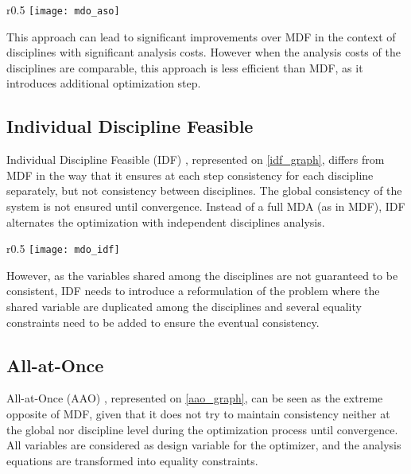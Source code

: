 \begin{wrapfigure}{r}{0.5\textwidth}
\centering
\texttt{[image: mdo\_aso]}
\caption{ASO method}\label{aso_graph}
\end{wrapfigure}

This approach can lead to significant improvements over MDF in the context of disciplines with significant analysis costs. However when the analysis costs of the disciplines are comparable, this approach is less efficient than MDF, as it introduces additional optimization step.

\subsection{Individual Discipline Feasible}

Individual Discipline Feasible (IDF) \cite{cramer1994problem}, represented on \figurename{} \ref{idf_graph}, differs from MDF in the way that it ensures at each step consistency for each discipline separately, but not consistency between disciplines. The global consistency of the system is not ensured until convergence.
Instead of a full MDA (as in MDF), IDF alternates the optimization with independent disciplines analysis.

\begin{wrapfigure}{r}{0.5\textwidth}
\centering
\texttt{[image: mdo\_idf]}
\caption{IDF method}\label{idf_graph}
\end{wrapfigure}

However, as the variables shared among the disciplines are not guaranteed to be consistent, IDF needs to introduce a reformulation of the problem where the shared variable are duplicated among the disciplines and several equality constraints need to be added to ensure the eventual consistency.

\subsection{All-at-Once}

All-at-Once (AAO) \cite{haftka1985simultaneous, cramer1994problem}, represented on \figurename{} \ref{aao_graph}, can be seen as the extreme opposite of MDF, given that it does not try to maintain consistency neither at the global nor discipline level during the optimization process until convergence.
All variables are considered as design variable for the optimizer, and the analysis equations are transformed into equality constraints.

